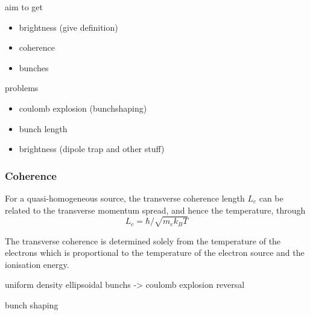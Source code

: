 aim to get
\begin{itemize}
    \item brightness (give definition)
    \item coherence
    \item bunches
\end{itemize}

problems
\begin{itemize}
    \item coulomb explosion (bunchshaping)
    \item bunch length
    \item brightness (dipole trap and other stuff)
\end{itemize}


\subsubsection{Coherence}
For a quasi-homogeneous source\cite{nugent_coherent_2009}, the transverse coherence length $L_c$ can be related to the transverse momentum spread, and hence the temperature, through\cite{van_oudheusden_electron_2007}
\begin{equation}
L_c = \hbar/\sqrt{m_e k_B T}
\end{equation}

The transverse coherence is determined solely from the temperature of the electrons which is proportional to the temperature of the electron source and the ionisation energy.



uniform density ellipsoidal bunchs -> coulomb explosion reversal\cite{van_der_geer_simulated_2007}

bunch shaping \cite{mcculloch_arbitrarily_2011}


